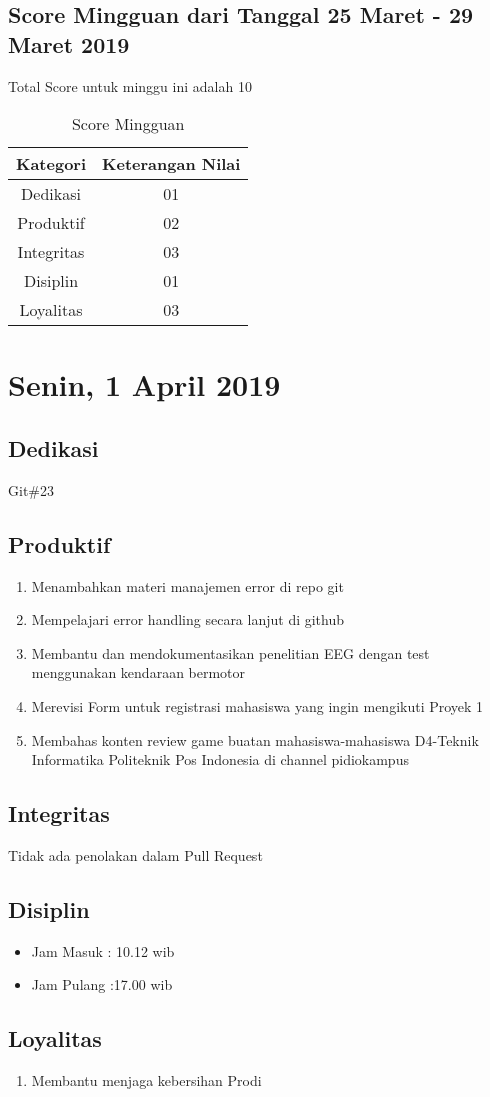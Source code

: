 \subsection{Score Mingguan dari Tanggal 25 Maret - 29 Maret 2019}
Total Score untuk minggu ini adalah 10

\begin{table}[h]
\caption{Score Mingguan}
\centering
\begin{tabular}{|c|c|}
\hline
\textbf{Kategori}&\textbf{Keterangan Nilai}\\
\hline
Dedikasi&01\\
\hline
Produktif&02\\
\hline
Integritas&03\\
\hline
Disiplin&01\\
\hline
Loyalitas&03\\
\hline
\end{tabular}
\label{table:score mingguan}
\end{table}

\section{Senin, 1 April 2019}
\subsection{Dedikasi}
Git\#23
\subsection{Produktif}
\begin{enumerate}
\item Menambahkan materi manajemen error di repo git
\item Mempelajari error handling secara lanjut di github
\item Membantu dan mendokumentasikan penelitian EEG dengan test menggunakan kendaraan bermotor
\item Merevisi Form untuk registrasi mahasiswa yang ingin mengikuti Proyek 1
\item Membahas konten review game buatan mahasiswa-mahasiswa D4-Teknik Informatika Politeknik Pos Indonesia di channel pidiokampus
\end{enumerate}
\subsection{Integritas}
Tidak ada penolakan dalam Pull Request
\subsection{Disiplin}
\begin{itemize}
\item Jam Masuk : 10.12 wib
\item Jam Pulang :17.00 wib
\end{itemize}
\subsection{Loyalitas}
\begin{enumerate}
\item Membantu menjaga kebersihan Prodi
\end{enumerate}